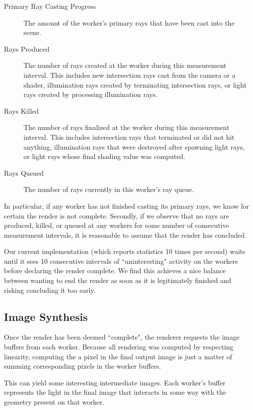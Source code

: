\documentclass[12pt]{ucthesis}
\begin{document}
\begin{description}
   \item[Primary Ray Casting Progress] The amount of the worker's primary rays
      that have been cast into the scene.
   \item[Rays Produced] The number of rays created at the worker during this
      measurement interval. This includes new intersection rays cast from the
      camera or a shader, illumination rays created by terminating intersection
      rays, or light rays created by processing illumination rays.
   \item[Rays Killed] The number of rays finalized at the worker during this
      measurement interval. This includes intersection rays that terminated or
      did not hit anything, illumination rays that were destroyed after spawning
      light rays, or light rays whose final shading value was computed.
   \item[Rays Queued] The number of rays currently in this worker's ray queue.
\end{description}

In particular, if any worker has not finished casting its primary rays, we
know for certain the render is not complete. Secondly, if we observe that no
rays are produced, killed, or queued at any workers for some number of
consecutive measurement intervals, it is reasonable to assume that the render
has concluded.

Our current implementation (which reports statistics 10 times per second)
waits until it sees 10 consecutive intervals of ``uninteresting" activity on
the workers before declaring the render complete. We find this achieves a nice
balance between wanting to end the render as soon as it is legitimately
finished and risking concluding it too early.

\subsection{Image Synthesis}
\label{synthesis}

Once the render has been deemed ``complete", the renderer requests the image
buffers from each worker. Because all rendering was computed by respecting
linearity, computing the a pixel in the final output image is just a matter
of summing corresponding pixels in the worker buffers.

This can yield some interesting intermediate images. Each worker's buffer
represents the light in the final image that interacts in some way with the
geometry present on that worker.
\end{document}
